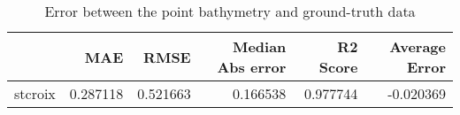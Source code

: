 \begin{table}[h!]
\caption{Error between the point bathymetry and ground-truth data}
\label{tab:stcroix_lidar_error}
\begin{tabular}{lrrrrr}
\toprule
 & MAE & RMSE & Median Abs error & R2 Score & Average Error \\
\midrule
stcroix & 0.287118 & 0.521663 & 0.166538 & 0.977744 & -0.020369 \\
\bottomrule
\end{tabular}
\end{table}
